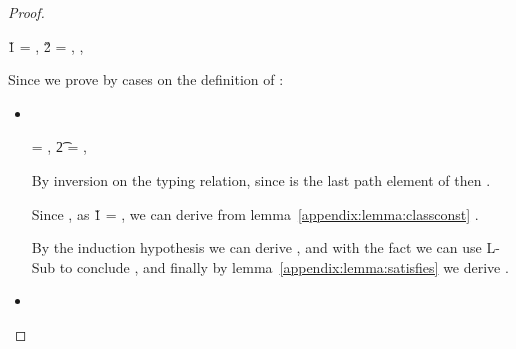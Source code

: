 \begin{lemma}
\begin{proof}
\begin{itemize}
\begin{subcase}[\isaopsem{\class{1}}{\class{2}} = {\true{}}, \text{if}\ \issubtypein{}{\class{1}}{\class{2}}]
              \v{1} = , \v{2} = ,
              ,
              \istrueval{\v{}}
              
              Since \istrueval{\v{}} we prove {\satisfies{\openv{}}{\thenprop{\prop{}}}}
              by cases on the definition of \isacompareliteral{}:
              \begin{itemize} %
                \item[]
                  \begin{subcase}[\isacompare{\s{}}{\pth{\classpe{}}{\pth{\pathelem{}}{\x{}}}}{\Value{\class{}}}
                                 {\filterset{\isprop{\class{}} {\pth{\pathelem{}}{\x{}}}}
                                            {\notprop{\class{}}{\pth{\pathelem{}}{\x{}}}}}]
                    \ 


                     = {\pth{\classpe{}}{\pth{\pathelem{}}{\x{}}}},
                    \t{2} = {},

                    By inversion on the typing relation, since \classpe{} is the last path element of 
                    then .

                    Since {},
                    as {\v{1}} = {},
                    we can derive from lemma~\ref{appendix:lemma:classconst}
                    {}.

                    By the induction hypothesis we can derive 
                    {},
                    and with the fact {}
                    we can use L-Sub to conclude 
                    {},
                    and finally by lemma~\ref{appendix:lemma:satisfies}
                    we derive
                    {}.

                  \end{subcase}
                \item[]
                  \begin{subcase}
                    \ 


\end{subcase}
\end{itemize}
\end{subcase}
\end{itemize}
\end{proof}
\end{lemma}
